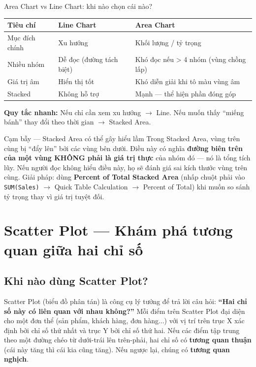 \documentclass[12pt]{article}
\begin{document}
\begin{tipbox}{Area Chart vs Line Chart: khi nào chọn cái nào?}
\renewcommand{\arraystretch}{1.3}
\begin{tabularx}{\linewidth}{l X X}
\toprule
\textbf{Tiêu chí} & \textbf{Line Chart} & \textbf{Area Chart} \\
\midrule
Mục đích chính & Xu hướng & Khối lượng / tỷ trọng \\
Nhiều nhóm & Dễ đọc (đường tách biệt) & Khó đọc nếu > 4 nhóm (vùng chồng lấp) \\
Giá trị âm & Hiển thị tốt & Khó diễn giải khi tô màu vùng âm \\
Stacked & Không hỗ trợ & Mạnh --- thể hiện phần đóng góp \\
\bottomrule
\end{tabularx}

\noindent \textbf{Quy tắc nhanh:} Nếu chỉ cần xem xu hướng $\rightarrow$ Line. Nếu muốn thấy ``miếng bánh'' thay đổi theo thời gian $\rightarrow$ Stacked Area.
\end{tipbox}

\begin{warningbox}{Cạm bẫy --- Stacked Area có thể gây hiểu lầm}
Trong Stacked Area, vùng trên cùng bị ``đẩy lên'' bởi các vùng bên dưới. Điều này có nghĩa \textbf{đường biên trên của một vùng KHÔNG phải là giá trị thực} của nhóm đó --- nó là tổng tích lũy. Nếu người đọc không hiểu điều này, họ sẽ đánh giá sai kích thước vùng trên cùng. Giải pháp: dùng \textbf{Percent of Total Stacked Area} (nhấp chuột phải vào \texttt{SUM(Sales)} $\rightarrow$ Quick Table Calculation $\rightarrow$ Percent of Total) khi muốn so sánh tỷ trọng thay vì giá trị tuyệt đối.
\end{warningbox}

\section{Scatter Plot --- Khám phá tương quan giữa hai chỉ số}

\subsection{Khi nào dùng Scatter Plot?}

\noindent Scatter Plot (biểu đồ phân tán) là công cụ lý tưởng để trả lời câu hỏi: \textbf{``Hai chỉ số này có liên quan với nhau không?''} Mỗi điểm trên Scatter Plot đại diện cho một đơn thể (sản phẩm, khách hàng, đơn hàng...) với vị trí trên trục X xác định bởi chỉ số thứ nhất và trục Y bởi chỉ số thứ hai. Nếu các điểm tập trung theo một đường chéo từ dưới-trái lên trên-phải, hai chỉ số có \textbf{tương quan thuận} (cái này tăng thì cái kia cũng tăng). Nếu ngược lại, chúng có \textbf{tương quan nghịch}.
\end{document}
